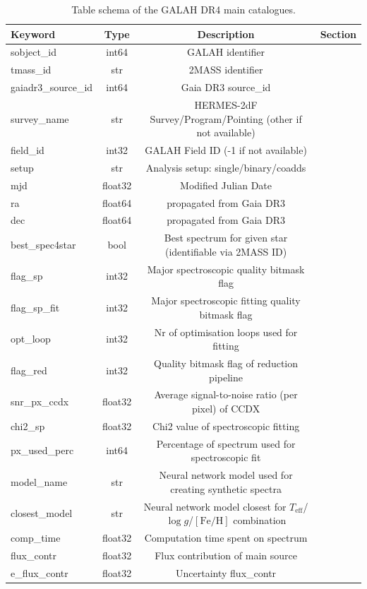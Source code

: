 \documentclass[
  journal=pasa,
  manuscript=research-paper, %
  year=2023,
  volume=37
]{cup-journal}
\newcommand{\Teff}{$T_\mathrm{eff}$\xspace}
\newcommand{\logg}{$\log g$\xspace}
\newcommand{\feh}{$\mathrm{[Fe/H]}$\xspace}
\begin{document}
\begin{table}
\caption{Table schema of the GALAH DR4 main catalogues.} \label{tab:main_catalog_schema1}
\centering
\begin{tabular}{lccc}
\hline\hline
Keyword	&	Type	&	Description	&	Section	\\
\hline
sobject\_id	&	int64	&	GALAH identifier	&		\\
tmass\_id	&	str	&	2MASS identifier	&		\\
gaiadr3\_source\_id	&	int64	&	Gaia DR3 source\_id	&		\\
survey\_name	&	str	&	HERMES-2dF Survey/Program/Pointing (other if not available)	&		\\
field\_id	&	int32	&	GALAH Field ID (-1 if not available)	&		\\
setup	&	str	&	Analysis setup: single/binary/coadds	&		\\
mjd	&	float32	&	Modified Julian Date	&		\\
ra	&	float64	&	propagated from Gaia DR3	&		\\
dec	&	float64	&	propagated from Gaia DR3	&		\\
best\_spec4star	&	bool	&	Best spectrum for given star (identifiable via 2MASS ID)	&		\\
flag\_sp	&	int32	&	Major spectroscopic quality bitmask flag	&		\\
flag\_sp\_fit	&	int32	&	Major spectroscopic fitting quality bitmask flag	&		\\
opt\_loop	&	int32	&	Nr of optimisation loops used for fitting	&		\\
flag\_red	&	int32	&	Quality bitmask flag of reduction pipeline	&		\\
snr\_px\_ccdx	&	float32	&	Average signal-to-noise ratio (per pixel) of CCDX	&		\\
chi2\_sp	&	float32	&	Chi2 value of spectroscopic fitting	&		\\
px\_used\_perc	&	int64	&	Percentage of spectrum used for spectroscopic fit	&		\\
model\_name	&	str	&	Neural network model used for creating synthetic spectra	&		\\
closest\_model	&	str	&	Neural network model closest for \Teff/\logg/\feh combination	&		\\
comp\_time	&	float32	&	Computation time spent on spectrum	&		\\
flux\_contr	&	float32	&	Flux contribution of main source	&		\\
e\_flux\_contr	&	float32	&	Uncertainty flux\_contr	&		\\

\end{tabular}
\end{table}
\end{document}

